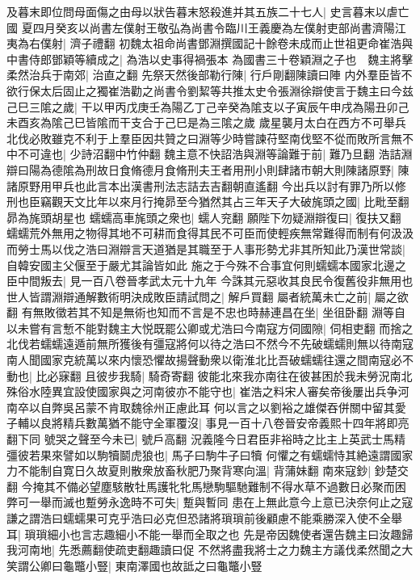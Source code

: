 及暮末即位問母面傷之由母以狀告暮末怒殺進并其五族二十七人|{
	史言暮末以虐亡國}
夏四月癸亥以尚書左僕射王敬弘為尚書令臨川王義慶為左僕射吏部尚書濟陽江夷為右僕射|{
	濟子禮翻}
初魏太祖命尚書鄧淵撰國記十餘卷未成而止世祖更命崔浩與中書侍郎鄧穎等續成之|{
	為浩以史事得禍張本}
為國書三十卷穎淵之子也　魏主將擊柔然治兵于南郊|{
	治直之翻}
先祭天然後部勒行陳|{
	行戶剛翻陳讀曰陣}
内外羣臣皆不欲行保太后固止之獨崔浩勸之尚書令劉絜等共推太史令張淵徐辯使言于魏主曰今兹己巳三隂之歲|{
	干以甲丙戊庚壬為陽乙丁己辛癸為隂支以子寅辰午申戌為陽丑卯己未酉亥為隂己巳皆隂而干支合于己巳是為三隂之歲}
歲星襲月太白在西方不可舉兵北伐必敗雖克不利于上羣臣因共贊之曰淵等少時嘗諫苻堅南伐堅不從而敗所言無不中不可違也|{
	少詩沼翻中竹仲翻}
魏主意不快詔浩與淵等論難于前|{
	難乃旦翻}
浩詰淵辯曰陽為德隂為刑故日食脩德月食脩刑夫王者用刑小則肆諸市朝大則陳諸原野|{
	陳諸原野用甲兵也此言本出漢書刑法志詰去吉翻朝直遙翻}
今出兵以討有罪乃所以修刑也臣竊觀天文比年以來月行掩昴至今猶然其占三年天子大破旄頭之國|{
	比毗至翻昴為旄頭胡星也}
蠕蠕高車旄頭之衆也|{
	蠕人兖翻}
願陛下勿疑淵辯復曰|{
	復扶又翻}
蠕蠕荒外無用之物得其地不可耕而食得其民不可臣而使輕疾無常難得而制有何汲汲而勞士馬以伐之浩曰淵辯言天道猶是其職至于人事形勢尤非其所知此乃漢世常談|{
	自韓安國主父偃至于嚴尤其論皆如此}
施之于今殊不合事宜何則蠕蠕本國家北邊之臣中間叛去|{
	見一百八卷晉孝武太元十九年}
今誅其元惡收其良民令復舊役非無用也世人皆謂淵辯通解數術明決成敗臣請試問之|{
	解戶買翻}
屬者統萬未亡之前|{
	屬之欲翻}
有無敗徵若其不知是無術也知而不言是不忠也時赫連昌在坐|{
	坐徂卧翻}
淵等自以未嘗有言慙不能對魏主大悦既罷公卿或尤浩曰今南寇方伺國隙|{
	伺相吏翻}
而捨之北伐若蠕蠕遠遁前無所獲後有彊寇將何以待之浩曰不然今不先破蠕蠕則無以待南寇南人聞國家克統萬以來内懷恐懼故揚聲動衆以衛淮北比吾破蠕蠕往還之間南寇必不動也|{
	比必寐翻}
且彼步我騎|{
	騎奇寄翻}
彼能北來我亦南往在彼甚困於我未勞況南北殊俗水陸異宜設使國家與之河南彼亦不能守也|{
	崔浩之料宋人審矣帝後屢出兵争河南卒以自弊吳呂蒙不肯取魏徐州正慮此耳}
何以言之以劉裕之雄傑吞併關中留其愛子輔以良將精兵數萬猶不能守全軍覆沒|{
	事見一百十八卷晉安帝義熙十四年將即亮翻下同}
號哭之聲至今未已|{
	號戶高翻}
況義隆今日君臣非裕時之比主上英武士馬精彊彼若果來譬如以駒犢鬬虎狼也|{
	馬子曰駒牛子曰犢}
何懼之有蠕蠕恃其絶遠謂國家力不能制自寛日久故夏則散衆放畜秋肥乃聚背寒向溫|{
	背蒲妹翻}
南來寇鈔|{
	鈔楚交翻}
今掩其不備必望塵駭散牡馬護牝牝馬戀駒驅馳難制不得水草不過數日必聚而困弊可一舉而滅也蹔勞永逸時不可失|{
	蹔與暫同}
患在上無此意今上意已決奈何止之寇謙之謂浩曰蠕蠕果可克乎浩曰必克但恐諸將瑣瑣前後顧慮不能乘勝深入使不全舉耳|{
	瑣瑣細小也言志趣細小不能一舉而全取之也}
先是帝因魏使者還告魏主曰汝趣歸我河南地|{
	先悉薦翻使疏吏翻趣讀曰促}
不然將盡我將士之力魏主方議伐柔然聞之大笑謂公卿曰龜鼈小豎|{
	東南澤國也故詆之曰龜鼈小豎}
